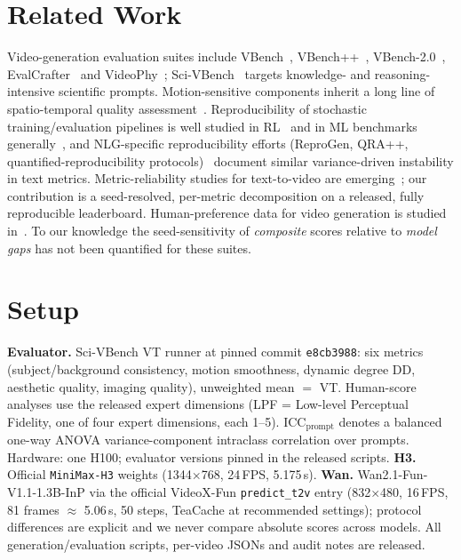 \documentclass[10pt,twocolumn]{article}
\begin{document}
\section{Related Work}
Video-generation evaluation suites include
VBench~\cite{vbench}, VBench++~\cite{vbenchpp}, VBench-2.0~\cite{vbench2},
EvalCrafter~\cite{evalcrafter} and VideoPhy~\cite{videophy}; Sci-VBench~\cite{scivbench}
targets knowledge- and reasoning-intensive scientific prompts. Motion-sensitive
components inherit a long line of spatio-temporal quality
assessment~\cite{motiontuned}. Reproducibility of stochastic training/evaluation
pipelines is well studied in RL~\cite{henderson2018} and in ML benchmarks
generally~\cite{bouthillier2021variance,keeling2024quantifying}, and
NLG-specific reproducibility efforts (ReproGen, QRA++,
quantified-reproducibility protocols)~\cite{reprogen2021,qra2025} document
similar variance-driven instability in text metrics. Metric-reliability studies
for text-to-video are emerging~\cite{t2vmetricreliability}; our contribution is
a seed-resolved, per-metric decomposition on a released, fully reproducible
leaderboard. Human-preference data for video generation is studied
in~\cite{videofeedback}. To our knowledge the
seed-sensitivity of \emph{composite} scores relative to \emph{model gaps} has
not been quantified for these suites.

\section{Setup}
\textbf{Evaluator.} Sci-VBench VT runner at pinned commit
\texttt{e8cb3988}: six metrics (subject/background consistency, motion
smoothness, dynamic degree DD, aesthetic quality, imaging quality), unweighted
mean $=$ VT. Human-score analyses use the released expert dimensions (LPF =
Low-level Perceptual Fidelity, one of four expert dimensions, each 1--5). ICC$_{\text{prompt}}$ denotes a
balanced one-way ANOVA variance-component intraclass correlation over prompts.
Hardware: one H100; evaluator versions pinned in the released scripts.
\textbf{H3.} Official \texttt{MiniMax-H3} weights (1344$\times$768, 24\,FPS,
5.175\,s). \textbf{Wan.} Wan2.1-Fun-V1.1-1.3B-InP via the official
VideoX-Fun \texttt{predict\_t2v} entry (832$\times$480, 16\,FPS, 81 frames
$\approx$ 5.06\,s, 50 steps, TeaCache at recommended settings); protocol
differences are explicit and we never compare absolute scores across models.
All generation/evaluation scripts, per-video JSONs and audit notes are
released.
\end{document}
